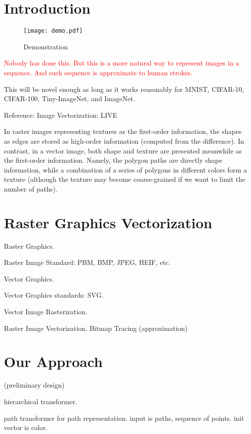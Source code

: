 \documentclass[10pt,twocolumn,letterpaper]{article}
\begin{document}
\section{Introduction}
\label{sec:intro}

\begin{figure}[t]
    \texttt{[image: demo.pdf]}
    \caption{Demonstration}
\end{figure}

\textcolor{red}{Nobody has done this. But this is a more natural way to represent images in a sequence. 
And such sequence is approximate to human strokes.}

This will be novel enough as long as it works reasonably for MNIST, CIFAR-10,
CIFAR-100, Tiny-ImageNet, and ImageNet.

Reference: Image Vectorization: LIVE \cite{live,dvg}

In raster images representing textures as the first-order information,
the shapes as edges are stored as high-order information (computed from the
difference).
%
In contrast, in a vector image, both shape and texture are presented meanwhile
as the first-order information.
%
Namely, the polygon paths are directly shape information, while a combination of
a series of polygons in different colors form a texture (although the texture
may become coarse-grained if we want to limit the number of paths).

\section{Raster Graphics Vectorization}

Raster Graphics.

Raster Image Standard: PBM, BMP, JPEG, HEIF, etc.

Vector Graphics.

Vector Graphics standards: SVG.

Vector Image Rasterization.

Raster Image Vectorization. Bitmap Tracing (approximation)

\section{Our Approach}

(preliminary design)

hierarchical transformer.

path transformer for path representation. input is paths, sequence of points. init vector is color.
\end{document}
